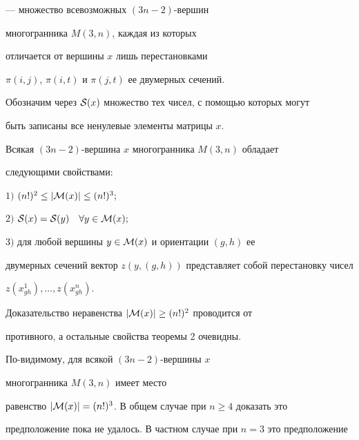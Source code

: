 --- множество всевозможных $(3n-2)$-вершин 


многогранника $M(3,n)$, каждая из которых


отличается от вершины $x$ лишь перестановками


$\pi(i,j)$, $\pi(i,t)$ и $\pi(j,t)$ ее двумерных сечений.





Обозначим через ${\cal S}(x)$ множество тех чисел, с помощью которых могут 


быть записаны все ненулевые элементы матрицы $x$.





\begin{thm}


Всякая $(3n-2)$-вершина $x$ многогранника $M(3,n)$ обладает


следующими свойствами\/${:}$





$1)$ $(n!)^2\le |{\cal M}(x)|\le (n!)^3;$





$2)$ ${\cal S}(x)={\cal S}(y)\quad\forall y\in {\cal M}(x);$





$3)$ для любой вершины $y\in {\cal M}(x)$ и ориентации $(g,h)$ ее


двумерных сечений вектор $z(y,(g,h))$ представляет собой перестановку чисел


$z(x^1_{gh}),\dotsc,z(x^n_{gh})$.


\end{thm}





Доказательство неравенства $|{\cal M}(x)|\ge (n!)^2$ проводится от 


противного, а остальные свойства теоремы 2 очевидны.





По-видимому, для всякой $(3n-2)$-вершины $x$ 


многогранника $M(3,n)$ имеет место


равенство $|{\cal M}(x)|=(n!)^3$. В общем случае при $n\ge 4$ доказать это


предположение пока не удалось. В частном случае при $n=3$ это предположение


